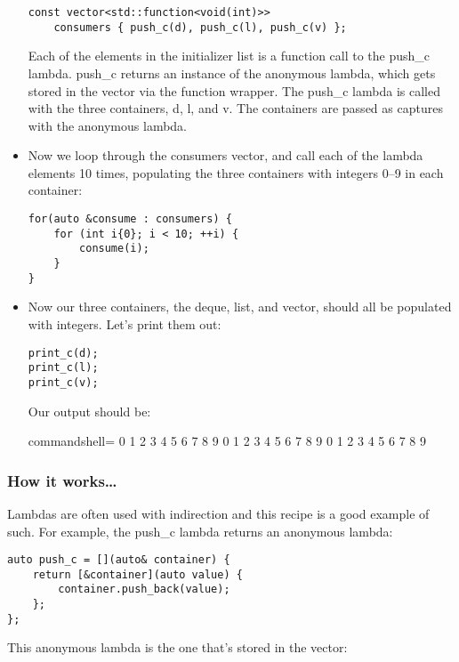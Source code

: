 \begin{itemize}
\begin{lstlisting}[style=styleCXX]
const vector<std::function<void(int)>>
	consumers { push_c(d), push_c(l), push_c(v) };
\end{lstlisting}

Each of the elements in the initializer list is a function call to the push\_c lambda. push\_c returns an instance of the anonymous lambda, which gets stored in the vector via the function wrapper. The push\_c lambda is called with the three containers, d, l, and v. The containers are passed as captures with the anonymous lambda.

\item 
Now we loop through the consumers vector, and call each of the lambda elements 10 times, populating the three containers with integers 0–9 in each container:

\begin{lstlisting}[style=styleCXX]
for(auto &consume : consumers) {
	for (int i{0}; i < 10; ++i) {
		consume(i);
	}
}
\end{lstlisting}

\item 
Now our three containers, the deque, list, and vector, should all be populated with integers. Let's print them out:

\begin{lstlisting}[style=styleCXX]
print_c(d);
print_c(l);
print_c(v);
\end{lstlisting}

Our output should be:
\begin{tcblisting}{commandshell={}}
0 1 2 3 4 5 6 7 8 9
0 1 2 3 4 5 6 7 8 9
0 1 2 3 4 5 6 7 8 9
\end{tcblisting}
\end{itemize}

\subsubsection{How it works…}

Lambdas are often used with indirection and this recipe is a good example of such. For example, the push\_c lambda returns an anonymous lambda:

\begin{lstlisting}[style=styleCXX]
auto push_c = [](auto& container) {
	return [&container](auto value) {
		container.push_back(value);
	};
};
\end{lstlisting}

This anonymous lambda is the one that's stored in the vector:

